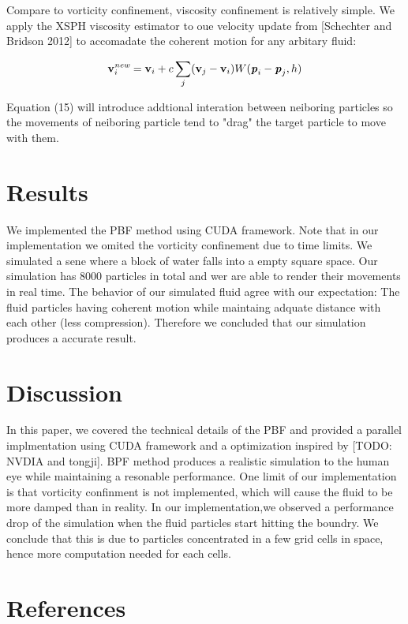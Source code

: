 \documentclass[acmtog]{acmart}
\begin{document}
Compare to vorticity confinement, viscosity confinement is relatively simple. 
We apply the XSPH viscosity estimator to oue velocity update from [Schechter and Bridson
2012] to accomadate the coherent motion for any arbitary fluid:

\begin{equation}
  \textbf{v}_{i}^{\textit{new}} = \textbf{v}_{i} + c \sum_{j} (\textbf{v}_{j} - \textbf{v}_{i}) W(\textbf{\textit{p}}_{i} - \textbf{\textit{p}}_{j}, h)
\end{equation}

Equation (15) will introduce addtional interation between neiboring particles so the movements of neiboring 
particle tend to "drag" the target particle to move with them.

\section{Results}
We implemented the PBF method using CUDA framework. 
Note that in our implementation we omited the vorticity confinement due to time limits. We simulated a sene where
a block of water falls into a empty square space. Our simulation has 8000 particles in total and wer are able to render their
movements in real time. The behavior of our simulated fluid agree with our expectation: 
The fluid particles having coherent motion while maintaing adquate distance with each other (less compression).
Therefore we concluded that our simulation produces a accurate result.

\section{Discussion}

In this paper, we covered the technical details of the PBF and provided a parallel implmentation using CUDA framework and a optimization inspired by [TODO: NVDIA and tongji].
BPF method produces a realistic simulation to the human eye while maintaining a resonable performance. 
One limit of our implementation is that vorticity confinment is not implemented, which will cause the fluid to be more damped than in reality. 
In our implementation,we observed a performance drop of the simulation when the fluid particles start hitting the boundry. We conclude that this is due to particles concentrated in 
a few grid cells in space, hence more computation needed for each cells.




\section{References}
\end{document}
